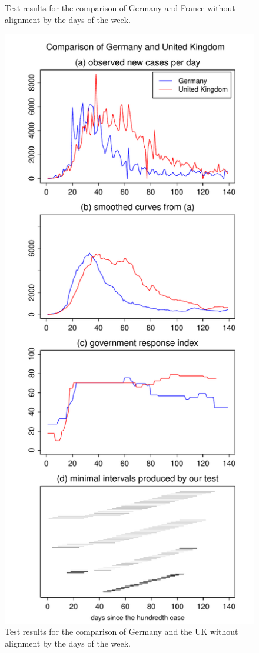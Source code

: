 \documentclass[a4paper,12pt]{article}
\numberwithin{equation}{section}
\begin{document}
\begin{figure}[h!]
\begin{minipage}[t]{0.49\textwidth}
\caption{Test results for the comparison of Germany and France without alignment by the days of the week.}
\end{minipage}
\hspace{0.25cm}
\begin{minipage}[t]{0.49\textwidth}
\includegraphics[width=\textwidth]{plots/DEU_vs_GBR}
\caption{Test results for the comparison of Germany and the UK without alignment by the days of the week.}
\end{minipage}
\end{figure}
\end{document}
